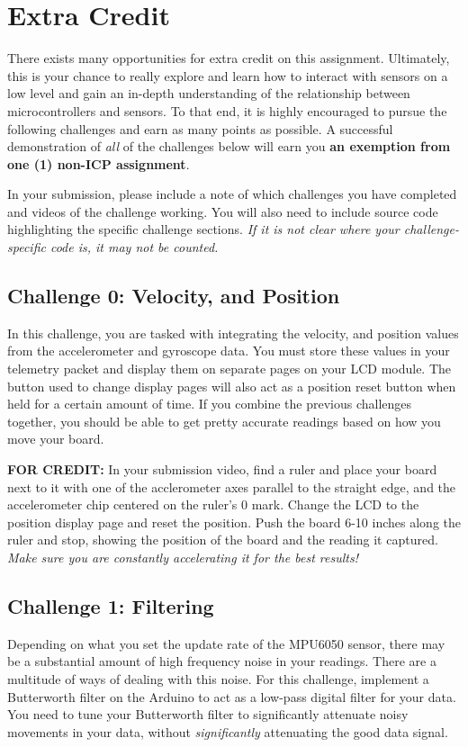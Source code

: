 \section*{Extra Credit} 
There exists many opportunities for extra credit on this assignment. 
Ultimately, this is your chance to really explore and learn how to interact with sensors on a low level and gain an in-depth understanding of the relationship between microcontrollers and sensors.
To that end, it is highly encouraged to pursue the following challenges and earn as many points as possible.
A successful demonstration of \emph{all} of the challenges below will earn you \textbf{an exemption from one (1) non-ICP assignment}.

In your submission, please include a note of which challenges you have completed and videos of the challenge working. 
You will also need to include source code highlighting the specific challenge sections.
\emph{If it is not clear where your challenge-specific code is, it may not be counted.}

    \subsection*{Challenge 0: Velocity, and Position}
    In this challenge, you are tasked with integrating the velocity, and position values from the accelerometer and gyroscope data.
    You must store these values in your telemetry packet and display them on separate pages on your LCD module.
    The button used to change display pages will also act as a position reset button when held for a certain amount of time.
    If you combine the previous challenges together, you should be able to get pretty accurate readings based on how you move your board.

    \textbf{FOR CREDIT:} In your submission video, find a ruler and place your board next to it with one of the acclerometer axes parallel to the straight edge, and the accelerometer chip centered on the ruler's 0 mark.
    Change the LCD to the position display page and reset the position.
    Push the board 6-10 inches along the ruler and stop, showing the position of the board and the reading it captured.
    \textit{Make sure you are constantly accelerating it for the best results!}

    \subsection*{Challenge 1: Filtering}
    Depending on what you set the update rate of the MPU6050 sensor, there may be a substantial amount of high frequency noise in your readings.
    There are a multitude of ways of dealing with this noise.
    For this challenge, implement a Butterworth filter on the Arduino to act as a low-pass digital filter for your data. 
    You need to tune your Butterworth filter to significantly attenuate noisy movements in your data, without \textit{significantly} attenuating the good data signal.
    
